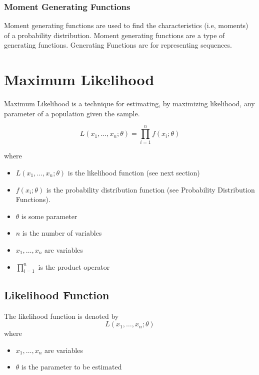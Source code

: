 \documentclass{article}
\begin{document}
\subsubsection{Moment Generating Functions}
Moment generating functions are used to find the characteristics (i.e, moments) of a probability distribution. Moment generating functions are a type of generating functions. Generating Functions are for representing sequences.

\newpage
\section{Maximum Likelihood}
Maximum Likelihood is a technique for estimating, by maximizing likelihood, any parameter of a population given the sample.

$$
L(x_1,\dots,x_n ;\theta)=\prod_{i=1}^{n} f(x_i; \theta)
$$ 

where 

\begin{itemize}
    \item $L(x_1, \dots, x_n; \theta)$ is the likelihood function (see next section)
    \item $f(x_i; \theta)$ is the probability distribution function (see Probability Distribution Functions).
    \item $\theta$ is some parameter
    \item $n$ is the number of variables
    \item $ x_1, \dots, x_n $ are variables
    \item $ \prod_{i=1}^{n} $ is the product operator
\end{itemize}

\subsection{Likelihood Function}
The likelihood function is denoted by
$$
L(x_1, \dots, x_n; \theta)
$$
where 

\begin{itemize}
    \item $ x_1, \dots, x_n $ are variables
    \item $\theta$ is the parameter to be estimated
\end{itemize}
\end{document}
